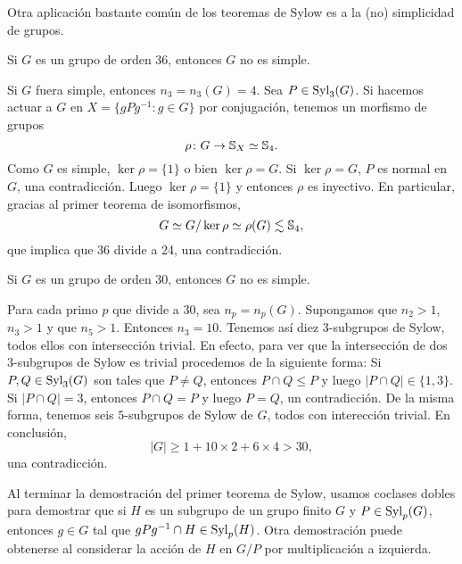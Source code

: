 Otra aplicación bastante común de los teoremas de Sylow es a la (no) simplicidad de grupos. 

\begin{example}
Si $G$ es un grupo de orden 36, entonces $G$ no es simple.

Si $G$ fuera simple, entonces $n_3=n_3(G)=4$. Sea $P\in\mathrm{Syl}_3(G)$. Si hacemos actuar a $G$ en $X=\{gPg^{-1}:g\in G\}$ por conjugación, 
tenemos un morfismo de grupos 
\[
\rho\colon G\to\mathbb{S}_X\simeq\mathbb{S}_4.
\]
Como $G$ es simple, $\ker\rho=\{1\}$ o bien $\ker\rho=G$. Si $\ker\rho=G$, $P$ es normal en $G$, una contradicción. Luego $\ker\rho=\{1\}$ y entonces $\rho$ es inyectivo. En particular, gracias al primer teorema de isomorfismos, 
\[
G\simeq G/\ker\rho\simeq\rho(G)\lesssim\mathbb{S}_4,
\]
que implica que 36 divide a 24, una contradicción.   	
\end{example}

\begin{example}
Si $G$ es un grupo de orden 30, entonces $G$ no es simple.

Para cada primo $p$ que divide a 30, sea $n_p=n_p(G)$. Supongamos que $n_2>1$, $n_3>1$ y que $n_5>1$. Entonces $n_3=10$. Tenemos así
diez $3$-subgrupos de Sylow, todos ellos con intersección trivial. En efecto, para ver que la intersección de dos $3$-subgrupos de Sylow es trivial procedemos de la siguiente forma: Si $P,Q\in\mathrm{Syl}_3(G)$ son tales que $P\ne Q$, entonces $P\cap Q\leq P$ y luego
$|P\cap Q|\in\{1,3\}$. Si $|P\cap Q|=3$, entonces $P\cap Q=P$ y luego $P=Q$, un contradicción. De la misma forma, tenemos seis $5$-subgrupos de Sylow de $G$, todos con interección trivial. En conclusión, 
\[
|G|\geq 1+10\times 2+6\times 4>30,
\]
una contradicción. 
\end{example}

Al terminar la demostración del primer teorema de Sylow, usamos coclases dobles para demostrar que  
si $H$ es un subgrupo de un grupo finito $G$ y 
$P\in\mathrm{Syl}_p(G)$, entonces $g\in G$ tal que $gPg^{-1}\cap H\in\mathrm{Syl}_p(H)$. Otra demostración
puede obtenerse al considerar la acción de $H$ en $G/P$ por multiplicación a izquierda.

